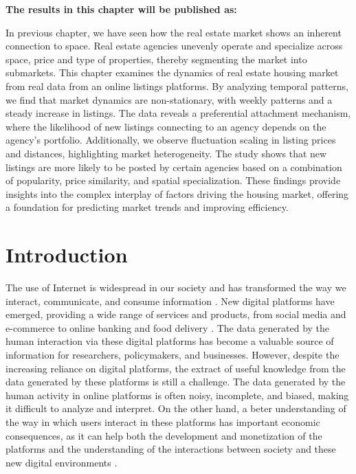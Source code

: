 \vspace{-1.5cm}
\small
\textbf{The results in this chapter will be published as:}
\vspace{0.05 cm}

\normalsize
\vspace{0.5 cm}

In previous chapter, we have seen how the real estate market shows an inherent connection to space. Real estate agencies unevenly operate and specialize across space, price and type of properties, thereby segmenting the market into submarkets. This chapter examines the dynamics of real estate housing market from real data from an online listings platforms. By analyzing temporal patterns, we find that market dynamics are non-stationary, with weekly patterns and a steady increase in listings. The data reveals a preferential attachment mechanism, where the likelihood of new listings connecting to an agency depends on the agency's portfolio. Additionally, we observe fluctuation scaling in listing prices and distances, highlighting market heterogeneity. The study shows that new listings are more likely to be posted by certain agencies based on a combination of popularity, price similarity, and spatial specialization. These findings provide insights into the complex interplay of factors driving the housing market, offering a foundation for predicting market trends and improving efficiency.

\section{Introduction}

The use of Internet is widespread in our society and has transformed the way we interact, communicate, and consume information \cite{berners-lee-2006,dorogovtsev2002evolution,pastor-satorras-2004,watts-2007}. New digital platforms have emerged, providing a wide range of services and products, from social media and e-commerce to online banking and food delivery \cite{unknown-author-2013}. The data generated by the human interaction via these digital platforms has become a valuable source of information for researchers, policymakers, and businesses. However, despite the increasing reliance on digital platforms, the extract of useful knowledge from the data generated by these platforms is still a challenge. The data generated by the human activity in online platforms is often noisy, incomplete, and biased, making it difficult to analyze and interpret. On the other hand, a beter understanding of the way in which users interact in these platforms has important economic consequences, as it can help both the development and monetization of the platforms and the understanding of the interactions between society and these new digital environments \cite{choudary-2016}.

